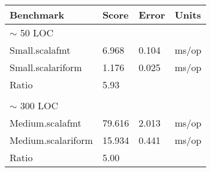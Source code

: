 \begin{tabular}{llll}
  Benchmark              &     Score &     Error &  Units\\
  \hline
  \hline
  $\sim$ 50 LOC \\
  Small.scalafmt         &     6.968 &    0.104 &  ms/op\\
  Small.scalariform      &     1.176 &    0.025 &  ms/op\\
  \hline
  Ratio            &   5.93   &  &    \\
  \\
  $\sim$ 300 LOC \\
  Medium.scalafmt        &    79.616 &    2.013 &  ms/op\\
  Medium.scalariform     &    15.934 &    0.441 &  ms/op\\
\hline
  Ratio            &   5.00   &  &
\end{tabular}
